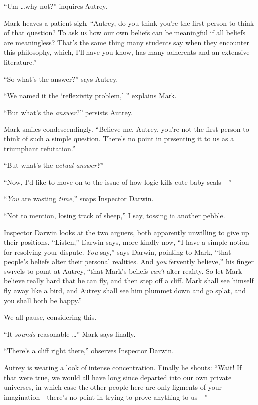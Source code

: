 {
 ``Um \ldots why not?'' inquires
Autrey.}

{
 Mark heaves a patient sigh. ``Autrey, do you
think you're the first person to think of that
question? To ask us how our own beliefs can be meaningful if all
beliefs are meaningless? That's the same thing many
students say when they encounter this philosophy, which,
I'll have you know, has many adherents and an extensive
literature.''}

{
 ``So what's the
answer?'' says Autrey.}

{
 ``We named it the `reflexivity
problem,' '' explains Mark.}

{
 ``But what's the
\textit{answer}?'' persists Autrey.}

{
 Mark smiles condescendingly. ``Believe me,
Autrey, you're not the first person to think of such a
simple question. There's no point in presenting it to
us as a triumphant refutation.''}

{
 ``But what's the \textit{actual
answer?}''}

{
 ``Now, I'd like to move on to the
issue of how logic kills cute baby seals---''}

{
 ``\textit{You} are wasting
\textit{time},'' snaps Inspector Darwin.}

{
 ``Not to mention, losing track of
sheep,'' I say, tossing in another pebble.}

{
 Inspector Darwin looks at the two arguers, both apparently
unwilling to give up their positions.
``Listen,'' Darwin says, more kindly
now, ``I have a simple notion for resolving your
dispute. \textit{You} say,'' says Darwin, pointing to
Mark, ``that people's beliefs alter
their personal realities. And \textit{you} fervently
believe,'' his finger swivels to point at Autrey,
``that Mark's beliefs
\textit{can't} alter reality. So let Mark believe
really hard that he can fly, and then step off a cliff. Mark shall see
himself fly away like a bird, and Autrey shall see him plummet down and
go splat, and you shall both be happy.''}

{
 We all pause, considering this.}

{
 ``It \textit{sounds} reasonable
\ldots'' Mark says finally.}

{
 ``There's a cliff right
there,'' observes Inspector Darwin.}

{
 Autrey is wearing a look of intense concentration. Finally he
shouts: ``Wait! If that were true, we would all have
long since departed into our own private universes, in which case the
other people here are only figments of your
imagination---there's no point in trying to prove
anything to us---''}

